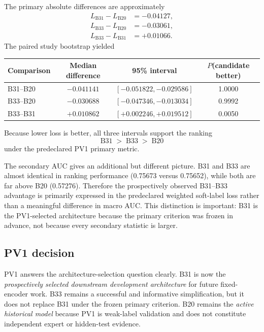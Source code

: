 \documentclass[preprint,12pt]{elsarticle}
\begin{document}
The primary absolute differences are approximately
\begin{align}
L_{\mathrm{B31}}-L_{\mathrm{B20}}&=-0.04127,\\
L_{\mathrm{B33}}-L_{\mathrm{B20}}&=-0.03061,\\
L_{\mathrm{B33}}-L_{\mathrm{B31}}&=+0.01066.
\end{align}
The paired study bootstrap yielded
\begin{center}
\begin{tabular}{lccc}
\toprule
Comparison & Median difference & 95\% interval & $P$(candidate better) \\
\midrule
B31--B20 & $-0.041141$ & $[-0.051822,-0.029586]$ & 1.0000 \\
B33--B20 & $-0.030688$ & $[-0.047346,-0.013034]$ & 0.9992 \\
B33--B31 & $+0.010862$ & $[+0.002246,+0.019512]$ & 0.0050 \\
\bottomrule
\end{tabular}
\end{center}
Because lower loss is better, all three intervals support the ranking
\begin{equation}
\boxed{\mathrm{B31}\;>\;\mathrm{B33}\;>\;\mathrm{B20}}
\end{equation}
under the predeclared PV1 primary metric.

The secondary AUC gives an additional but different picture. B31 and B33 are almost identical in ranking performance (0.75673 versus 0.75652), while both are far above B20 (0.57276). Therefore the prospectively observed B31--B33 advantage is primarily expressed in the predeclared weighted soft-label loss rather than a meaningful difference in macro AUC. This distinction is important: B31 is the PV1-selected architecture because the primary criterion was frozen in advance, not because every secondary statistic is larger.

\subsection{PV1 decision}
PV1 answers the architecture-selection question clearly. B31 is now the \emph{prospectively selected downstream development architecture} for future fixed-encoder work. B33 remains a successful and informative simplification, but it does not replace B31 under the frozen primary criterion. B20 remains the \emph{active historical model} because PV1 is weak-label validation and does not constitute independent expert or hidden-test evidence.
\end{document}
